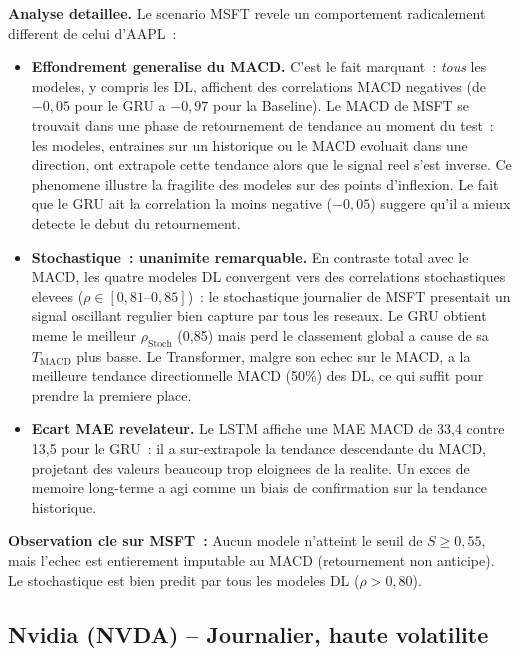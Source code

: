\documentclass[12pt, a4paper]{article}
\begin{document}
\textbf{Analyse detaillee.}
Le scenario MSFT revele un comportement radicalement different de celui d'AAPL~:

\begin{itemize}
  \item \textbf{Effondrement generalise du MACD.} C'est le fait marquant~: \emph{tous} les modeles, y compris les DL, affichent des correlations MACD negatives (de $-0{,}05$ pour le GRU a $-0{,}97$ pour la Baseline). Le MACD de MSFT se trouvait dans une phase de retournement de tendance au moment du test~: les modeles, entraines sur un historique ou le MACD evoluait dans une direction, ont extrapole cette tendance alors que le signal reel s'est inverse. Ce phenomene illustre la fragilite des modeles sur des points d'inflexion. Le fait que le GRU ait la correlation la moins negative ($-0{,}05$) suggere qu'il a mieux detecte le debut du retournement.

  \item \textbf{Stochastique~: unanimite remarquable.} En contraste total avec le MACD, les quatre modeles DL convergent vers des correlations stochastiques elevees ($\rho \in [0{,}81\text{--}0{,}85]$)~: le stochastique journalier de MSFT presentait un signal oscillant regulier bien capture par tous les reseaux. Le GRU obtient meme le meilleur $\rho_\text{Stoch}$ (0,85) mais perd le classement global a cause de sa $T_\text{MACD}$ plus basse. Le Transformer, malgre son echec sur le MACD, a la meilleure tendance directionnelle MACD (50\%) des DL, ce qui suffit pour prendre la premiere place.

  \item \textbf{Ecart MAE revelateur.} Le LSTM affiche une MAE MACD de 33,4 contre 13,5 pour le GRU~: il a sur-extrapole la tendance descendante du MACD, projetant des valeurs beaucoup trop eloignees de la realite. Un exces de memoire long-terme a agi comme un biais de confirmation sur la tendance historique.
\end{itemize}

\begin{resultbox}
\textbf{Observation cle sur MSFT~:} Aucun modele n'atteint le seuil de $S \geq 0{,}55$, mais l'echec est entierement imputable au MACD (retournement non anticipe). Le stochastique est bien predit par tous les modeles DL ($\rho > 0{,}80$).
\end{resultbox}

\subsection{Nvidia (NVDA) -- Journalier, haute volatilite}
\end{document}
